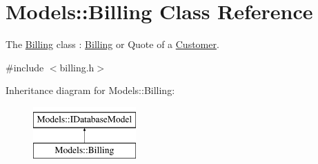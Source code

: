 \hypertarget{classModels_1_1Billing}{\section{Models\+:\+:Billing Class Reference}
\label{classModels_1_1Billing}
}


The \hyperlink{classModels_1_1Billing}{Billing} class \+: \hyperlink{classModels_1_1Billing}{Billing} or Quote of a \hyperlink{classModels_1_1Customer}{Customer}.  




{\ttfamily \#include $<$billing.\+h$>$}

Inheritance diagram for Models\+:\+:Billing\+:\begin{figure}[H]
\begin{center}
\leavevmode
\includegraphics[height=2.000000cm]{d4/d5c/classModels_1_1Billing}
\end{center}
\end{figure}
